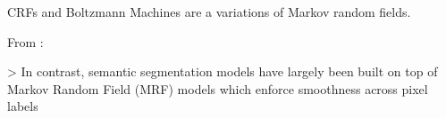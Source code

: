 \Glspl{CRF} and Boltzmann Machines are a variations of Markov random fields.

%















From \cite{yang2012layered}:

> In contrast, semantic segmentation models have largely been built on top of
Markov Random Field (MRF) models which enforce smoothness across pixel labels

